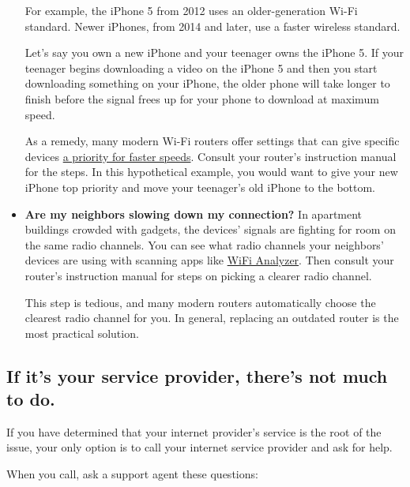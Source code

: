 \begin{itemize}
  For example, the iPhone 5 from 2012 uses an older-generation Wi-Fi
  standard. Newer iPhones, from 2014 and later, use a faster wireless
  standard.

  Let's say you own a new iPhone and your teenager owns the iPhone 5. If
  your teenager begins downloading a video on the iPhone 5 and then you
  start downloading something on your iPhone, the older phone will take
  longer to finish before the signal frees up for your phone to download
  at maximum speed.

  As a remedy, many modern Wi-Fi routers offer settings that can give
  specific devices
  \href{https://support.google.com/wifi/answer/6246483?hl=en}{a priority
  for faster speeds}. Consult your router's instruction manual for the
  steps. In this hypothetical example, you would want to give your new
  iPhone top priority and move your teenager's old iPhone to the bottom.
\item
  \textbf{Are my neighbors slowing down my connection?} In apartment
  buildings crowded with gadgets, the devices' signals are fighting for
  room on the same radio channels. You can see what radio channels your
  neighbors' devices are using with scanning apps like
  \href{https://play.google.com/store/apps/details?id=abdelrahman.wifianalyzerpro\&hl=en_US}{WiFi
  Analyzer}. Then consult your router's instruction manual for steps on
  picking a clearer radio channel.

  This step is tedious, and many modern routers automatically choose the
  clearest radio channel for you. In general, replacing an outdated
  router is the most practical solution.
\end{itemize}

\hypertarget{if-its-your-service-provider-theres-not-much-to-do}{%
\subsection{If it's your service provider, there's not much to
do.}\label{if-its-your-service-provider-theres-not-much-to-do}}

If you have determined that your internet provider's service is the root
of the issue, your only option is to call your internet service provider
and ask for help.

When you call, ask a support agent these questions:

